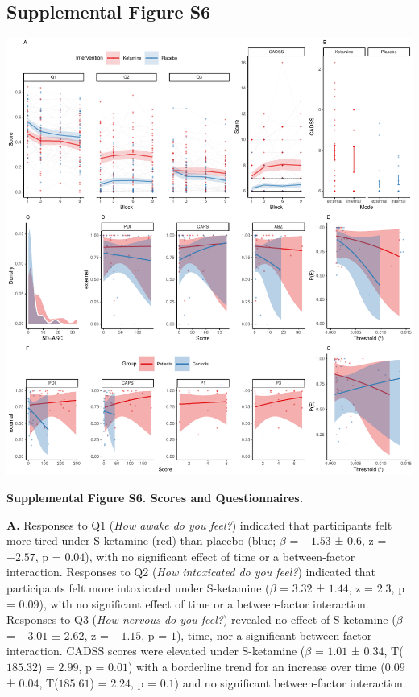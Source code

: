 \documentclass[
]{article}
\begin{document}
\subsection{Supplemental Figure S6}\label{supplemental-figure-s6}

\includegraphics{modes_ketamine_scz_files/figure-latex/Supplemental_Figure_S6-1.pdf}

\textbf{Supplemental Figure S6. Scores and Questionnaires.}

\textbf{A.} Responses to Q1 (\emph{How awake do you feel?}) indicated
that participants felt more tired under S-ketamine (red) than placebo
(blue; \(\beta\) = \(-1.53\) ± \(0.6\), z = \(-2.57\), p = \(0.04\)),
with no significant effect of time or a between-factor interaction.
Responses to Q2 (\emph{How intoxicated do you feel?}) indicated that
participants felt more intoxicated under S-ketamine (\(\beta\) =
\(3.32\) ± \(1.44\), z = \(2.3\), p = \(0.09\)), with no significant
effect of time or a between-factor interaction. Responses to Q3
(\emph{How nervous do you feel?}) revealed no effect of S-ketamine
(\(\beta\) = \(-3.01\) ± \(2.62\), z = \(-1.15\), p = \(1\)), time, nor
a significant between-factor interaction. CADSS scores were elevated
under S-ketamine (\(\beta\) = \(1.01\) ± \(0.34\), T(\(185.32\)) =
\(2.99\), p = \(0.01\)) with a borderline trend for an increase over
time (\(0.09\) ± \(0.04\), T(\(185.61\)) = \(2.24\), p = \(0.1\)) and no
significant between-factor interaction.
\end{document}
